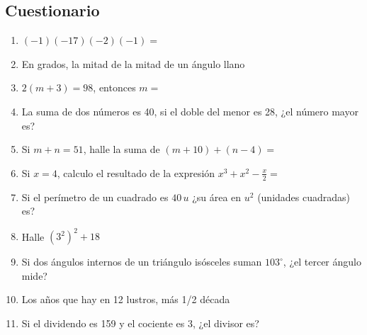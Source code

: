 \documentclass[11pt,twoside]{article}
\begin{document}
\subsection{Cuestionario}
 \begin{enumerate}
  \item $(-1)(-17)(-2)(-1)=$
  \item En grados, la mitad de la mitad de un ángulo llano
  \item $2(m+3)=98$, entonces $m=$
  \item La suma de dos números es 40, si el doble del menor es 28, ¿el número mayor es?
  \item Si $m+n=51$, halle la suma de $(m+10)+(n-4)=$
  \item Si $x=4$, calculo el resultado de la expresión $x^{3}+x^{2}-\frac{x}{2}=$
  \item Si el perímetro de un cuadrado es $40\,u$ ¿su área en $u^{2}$ (unidades cuadradas) es?
  \item Halle $(3^{2})^{2}+18$
  \item Si dos ángulos internos de un triángulo isósceles suman $103^{\circ}$, ¿el tercer ángulo mide?
  \item Los años que hay en 12 lustros, más 1/2 década
  \item Si el dividendo es 159 y el cociente es 3, ¿el divisor es?

\end{enumerate}
\end{document}
